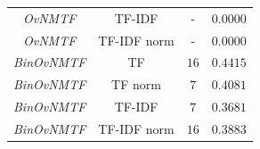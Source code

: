 \documentclass[
    12pt,                %
    oneside,            %
    a4paper,            %
    english,            %
    brazil                %
    ]{abntex2ppgsi}
\begin{document}
\begin{table}[H]
{\begin{tabular}{c|c|c|c}
            \textit{OvNMTF}        & TF-IDF        & -    & $0.0000$           \\
            \textit{OvNMTF}        & TF-IDF norm   & -    & $0.0000$           \\
            \hline
            \textit{BinOvNMTF}     & TF            & $16$ & $0.4415$           \\
            \textit{BinOvNMTF}     & TF norm       & $7$  & $0.4081$           \\
            \textit{BinOvNMTF}     & TF-IDF        & $7$  & $0.3681$           \\
            \textit{BinOvNMTF}     & TF-IDF norm   & $16$ & $0.3883$           \\
            \hline
        \end{tabular}
    }
\end{table}









\end{document}
